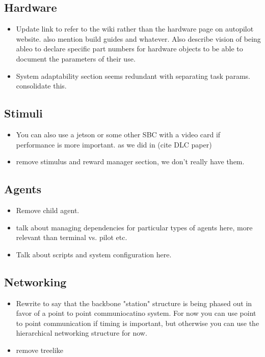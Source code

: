 \subsection{Hardware}

\begin{itemize}
\item Update link to refer to the wiki rather than the hardware page on autopilot website. also mention build guides and whatever. Also describe vision of being ableo to declare specific part numbers for hardware objects to be able to document the parameters of their use.
\item System adaptability section seems redundant with separating task params. consolidate this.
\end{itemize}

\subsection{Stimuli}

\begin{itemize}
\item You can also use a jetson or some other SBC with a video card if performance is more important. as we did in (cite DLC paper)
\item remove stimulus and reward manager section, we don't really have them.
\end{itemize}

\subsection{Agents}

\begin{itemize}
\item Remove child agent. 
\item talk about managing dependencies for particular types of agents here, more relevant than terminal vs. pilot etc.
\item Talk about scripts and system configuration here.
\end{itemize}

\subsection{Networking}

\begin{itemize}
\item Rewrite to say that the backbone "station" structure is being phased out in favor of a point to point communiocatino system. For now you can use point to point communication if timing is important, but otherwise you can use the hierarchical networking structure for now.
\item remove treelike
\end{itemize}

